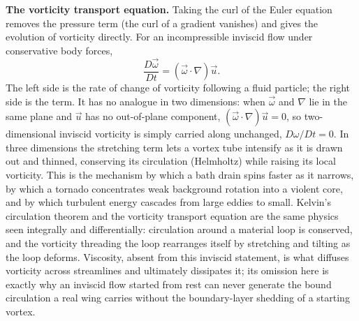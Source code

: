 \begin{mastery}
\textbf{The vorticity transport equation.} Taking the curl of the
Euler equation removes the pressure term (the curl of a gradient
vanishes) and gives the evolution of vorticity directly. For an
incompressible inviscid flow under conservative body forces,
\[
\frac{D\vec{\omega}}{Dt}
= (\vec{\omega}\cdot\nabla)\vec{u}.
\]
The left side is the rate of change of vorticity following a fluid
particle; the right side is the  term. It
has no analogue in two dimensions: when $\vec{\omega}$ and $\nabla$
lie in the same plane and $\vec{u}$ has no out-of-plane component,
$(\vec{\omega}\cdot\nabla)\vec{u} = 0$, so two-dimensional inviscid
vorticity is simply carried along unchanged, $D\omega/Dt = 0$. In
three dimensions the stretching term lets a vortex tube intensify as
it is drawn out and thinned, conserving its circulation (Helmholtz)
while raising its local vorticity. This is the mechanism by which a
bath drain spins faster as it narrows, by which a tornado concentrates
weak background rotation into a violent core, and by which turbulent
energy cascades from large eddies to small. Kelvin's circulation
theorem and the vorticity transport equation are the same physics
seen integrally and differentially: circulation around a material
loop is conserved, and the vorticity threading the loop rearranges
itself by stretching and tilting as the loop deforms. Viscosity,
absent from this inviscid statement, is what diffuses vorticity
across streamlines and ultimately dissipates it; its omission here is
exactly why an inviscid flow started from rest can never generate the
bound circulation a real wing carries without the boundary-layer
shedding of a starting vortex.
\end{mastery}

